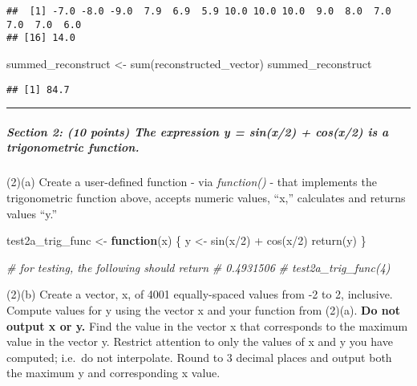 \documentclass[
]{article}
\newenvironment{Shaded}{\begin{snugshade}}{\end{snugshade}}
\newcommand{\CommentTok}[1]{\textcolor[rgb]{0.56,0.35,0.01}{\textit{#1}}}
\newcommand{\ControlFlowTok}[1]{\textcolor[rgb]{0.13,0.29,0.53}{\textbf{#1}}}
\newcommand{\DecValTok}[1]{\textcolor[rgb]{0.00,0.00,0.81}{#1}}
\newcommand{\FunctionTok}[1]{\textcolor[rgb]{0.00,0.00,0.00}{#1}}
\newcommand{\NormalTok}[1]{#1}
\newcommand{\OtherTok}[1]{\textcolor[rgb]{0.56,0.35,0.01}{#1}}
\newcommand{\SpecialCharTok}[1]{\textcolor[rgb]{0.00,0.00,0.00}{#1}}
\begin{document}
\begin{verbatim}
##  [1] -7.0 -8.0 -9.0  7.9  6.9  5.9 10.0 10.0 10.0  9.0  8.0  7.0  7.0  7.0  6.0
## [16] 14.0
\end{verbatim}

\begin{Shaded}
\begin{Highlighting}[]
\NormalTok{summed\_reconstruct }\OtherTok{\textless{}{-}} \FunctionTok{sum}\NormalTok{(reconstructed\_vector)}
\NormalTok{summed\_reconstruct}
\end{Highlighting}
\end{Shaded}

\begin{verbatim}
## [1] 84.7
\end{verbatim}

\begin{center}\rule{0.5\linewidth}{0.5pt}\end{center}

\hypertarget{section-2-10-points-the-expression-y-sinx2-cosx2-is-a-trigonometric-function.}{%
\subparagraph{Section 2: (10 points) The expression y = sin(x/2) +
cos(x/2) is a trigonometric
function.}\label{section-2-10-points-the-expression-y-sinx2-cosx2-is-a-trigonometric-function.}}

(2)(a) Create a user-defined function - via \emph{function()} - that
implements the trigonometric function above, accepts numeric values,
``x,'' calculates and returns values ``y.''

\begin{Shaded}
\begin{Highlighting}[]
\NormalTok{test2a\_trig\_func }\OtherTok{\textless{}{-}} \ControlFlowTok{function}\NormalTok{(x) \{}
\NormalTok{  y }\OtherTok{\textless{}{-}} \FunctionTok{sin}\NormalTok{(x}\SpecialCharTok{/}\DecValTok{2}\NormalTok{) }\SpecialCharTok{+} \FunctionTok{cos}\NormalTok{(x}\SpecialCharTok{/}\DecValTok{2}\NormalTok{)}
  \FunctionTok{return}\NormalTok{(y)}
\NormalTok{\}}

\CommentTok{\# for testing, the following should return}
\CommentTok{\# 0.4931506}
\CommentTok{\# test2a\_trig\_func(4)}
\end{Highlighting}
\end{Shaded}

(2)(b) Create a vector, x, of 4001 equally-spaced values from -2 to 2,
inclusive. Compute values for y using the vector x and your function
from (2)(a). \textbf{Do not output x or y.} Find the value in the vector
x that corresponds to the maximum value in the vector y. Restrict
attention to only the values of x and y you have computed; i.e.~do not
interpolate. Round to 3 decimal places and output both the maximum y and
corresponding x value.
\end{document}
